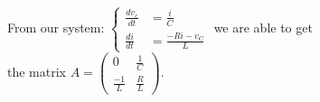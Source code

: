 \documentclass[preview]{standalone}
\begin{document}
\begin{center}
\raggedright
                    From our system: 
                    \(\left\{
                    \begin{aligned}
                        \frac{dv_c}{dt} &= \frac{i}{C} \\
                        \frac{di}{dt} &= \frac{-Ri - v_C}{L}
                    \end{aligned}
                    \right.\) we are able to get \\
                    the matrix \(A = \begin{pmatrix}
                                0 & \frac{1}{C} \\
                                \frac{-1}{L} & \frac{R}{L}
                            \end{pmatrix}\).
\end{center}
\end{document}
